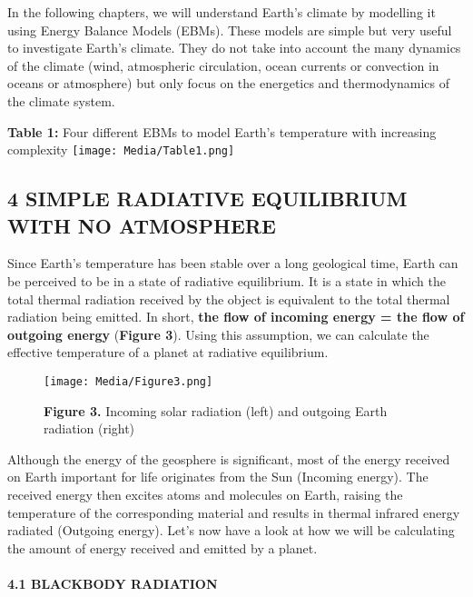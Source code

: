 \documentclass[
  letterpaper,
  DIV=11,
  numbers=noendperiod]{scrartcl}
\let\oldparagraph\paragraph
\renewcommand{\paragraph}[1]{\oldparagraph{#1}\mbox{}}
\begin{document}
In the following chapters, we will understand Earth's climate by
modelling it using Energy Balance Models (EBMs). These models are simple
but very useful to investigate Earth's climate. They do not take into
account the many dynamics of the climate (wind, atmospheric circulation,
ocean currents or convection in oceans or atmosphere) but only focus on
the energetics and thermodynamics of the climate system.

\textbf{Table 1:} Four different EBMs to model Earth's temperature with
increasing complexity
\texttt{[image: Media/Table1.png]}

\hypertarget{simple-radiative-equilibrium-with-no-atmosphere}{%
\subsection{4 \textbar{} SIMPLE RADIATIVE EQUILIBRIUM WITH NO
ATMOSPHERE}\label{simple-radiative-equilibrium-with-no-atmosphere}}

Since Earth's temperature has been stable over a long geological time,
Earth can be perceived to be in a state of radiative equilibrium. It is
a state in which the total thermal radiation received by the object is
equivalent to the total thermal radiation being emitted. In short,
\textbf{the flow of incoming energy = the flow of outgoing energy}
(\textbf{Figure 3}). Using this assumption, we can calculate the
effective temperature of a planet at radiative equilibrium.

\begin{figure}

{\centering \texttt{[image: Media/Figure3.png]}

}

\caption{\textbf{Figure 3.} Incoming solar radiation (left) and outgoing
Earth radiation (right)}

\end{figure}

Although the energy of the geosphere is significant, most of the energy
received on Earth important for life originates from the Sun (Incoming
energy). The received energy then excites atoms and molecules on Earth,
raising the temperature of the corresponding material and results in
thermal infrared energy radiated (Outgoing energy). Let's now have a
look at how we will be calculating the amount of energy received and
emitted by a planet.

\hypertarget{blackbody-radiation}{%
\paragraph{4.1 BLACKBODY RADIATION}\label{blackbody-radiation}}
\end{document}
